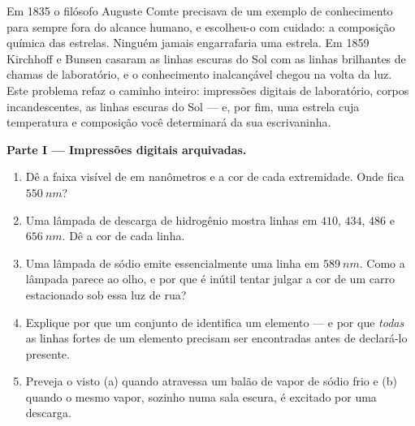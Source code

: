 \begin{problem}
\label{pb:g10:light-spectra:1}
Em 1835 o filósofo Auguste Comte precisava de um exemplo de conhecimento
para sempre fora do alcance humano, e escolheu-o com cuidado: a composição
química das estrelas. Ninguém jamais engarrafaria uma estrela. Em 1859
Kirchhoff e Bunsen casaram as linhas escuras do Sol com as linhas
brilhantes de chamas de laboratório, e o conhecimento inalcançável chegou
na volta da luz. Este problema refaz o caminho inteiro: impressões digitais
de laboratório, corpos incandescentes, as linhas escuras do Sol --- e, por
fim, uma estrela cuja temperatura e composição você determinará da sua
escrivaninha.

\medskip
\noindent\textbf{Parte I --- Impressões digitais arquivadas.}
\begin{enumerate}
  \item Dê a faixa visível de  em nanômetros e a cor de
        cada extremidade. Onde fica $\qty{550}{nm}$?
  \item Uma lâmpada de descarga de hidrogênio mostra linhas em $410$, $434$,
        $486$ e $\qty{656}{nm}$. Dê a cor de cada linha.
  \item Uma lâmpada de sódio emite essencialmente uma linha em
        $\qty{589}{nm}$. Como a lâmpada parece ao olho, e por que é inútil
        tentar julgar a cor de um carro estacionado sob essa luz de rua?
  \item Explique por que um conjunto de  identifica um
        elemento --- e por que \emph{todas} as linhas fortes de um elemento
        precisam ser encontradas antes de declará-lo presente.
  \item Preveja o  visto (a) quando  atravessa um balão de
        vapor de sódio frio e (b) quando o mesmo vapor, sozinho numa sala
        escura, é excitado por uma descarga.
\end{enumerate}


\end{problem}
